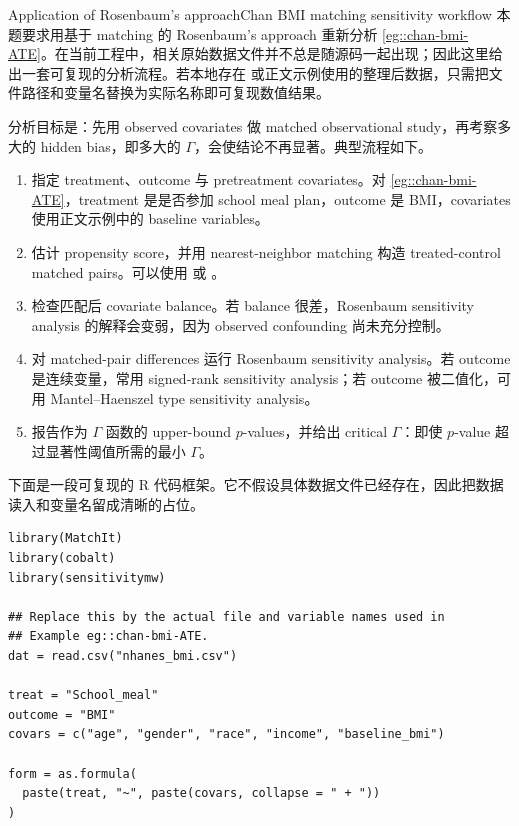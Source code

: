\begin{exercisesolution}{Application of Rosenbaum's approach}{Chan BMI matching sensitivity workflow}
本题要求用基于 matching 的 Rosenbaum's approach 重新分析 \cref{eg::chan-bmi-ATE}。在当前工程中，相关原始数据文件并不总是随源码一起出现；因此这里给出一套可复现的分析流程。若本地存在  或正文示例使用的整理后数据，只需把文件路径和变量名替换为实际名称即可复现数值结果。

分析目标是：先用 observed covariates 做 matched observational study，再考察多大的 hidden bias，即多大的 $\Gamma$，会使结论不再显著。典型流程如下。

\begin{enumerate}
\item
指定 treatment、outcome 与 pretreatment covariates。对 \cref{eg::chan-bmi-ATE}，treatment 是是否参加 school meal plan，outcome 是 BMI，covariates 使用正文示例中的 baseline variables。

\item
估计 propensity score，并用 nearest-neighbor matching 构造 treated-control matched pairs。可以使用  或 。

\item
检查匹配后 covariate balance。若 balance 很差，Rosenbaum sensitivity analysis 的解释会变弱，因为 observed confounding 尚未充分控制。

\item
对 matched-pair differences 运行 Rosenbaum sensitivity analysis。若 outcome 是连续变量，常用 signed-rank sensitivity analysis；若 outcome 被二值化，可用 Mantel--Haenszel type sensitivity analysis。

\item
报告作为 $\Gamma$ 函数的 upper-bound $p$-values，并给出 critical $\Gamma$：即使 $p$-value 超过显著性阈值所需的最小 $\Gamma$。
\end{enumerate}

下面是一段可复现的 R 代码框架。它不假设具体数据文件已经存在，因此把数据读入和变量名留成清晰的占位。

\begin{lstlisting}
library(MatchIt)
library(cobalt)
library(sensitivitymw)

## Replace this by the actual file and variable names used in
## Example eg::chan-bmi-ATE.
dat = read.csv("nhanes_bmi.csv")

treat = "School_meal"
outcome = "BMI"
covars = c("age", "gender", "race", "income", "baseline_bmi")

form = as.formula(
  paste(treat, "~", paste(covars, collapse = " + "))
)


\end{lstlisting}
\end{exercisesolution}
